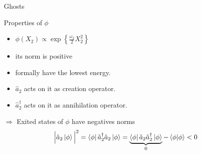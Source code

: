 \begin{frame}{Ghosts}
  \begin{alertblock}{Properties of $\phi$}
    \begin{itemize}
      \item $\phi(X_2) \propto \exp \left\{ \frac{\omega_2}{2} X_2^2\right\}$
      \item its norm is positive
      \item formally have the lowest energy.
      \item $\hat{a}_2$ acts on it as creation operator.
      \item $\hat{a}_2^{\dagger}$ acts on it as annihilation operator.
    \end{itemize}
  \end{alertblock}

  $\Rightarrow$ Exited states of $\phi$ have negatives norms
  \begin{equation*}
    {\Big| \hat{a}_2 \ket{\phi} \Big|}^2 =
    \bra{\phi} \hat{a}_2^{\dagger} \hat{a}_2 \ket{\phi} =
    \underbrace{
      \bra{\phi} \hat{a}_2 \hat{a}_2^{\dagger} \ket{\phi}
    }_{0} - \bra{\phi} \ket{\phi} < 0
  \end{equation*}
\end{frame}

